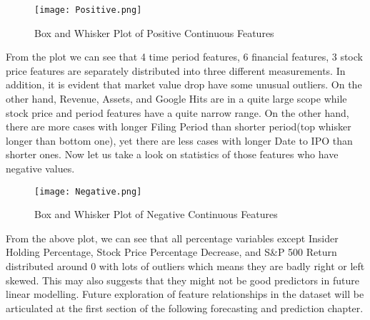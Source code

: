 \begin{figure}[H]
  \centering
  \texttt{[image: Positive.png]}
  \caption{Box and Whisker Plot of Positive Continuous Features}
\end{figure}
From the plot we can see that 4 time period features, 6 financial features, 3 stock price features are separately distributed into three different measurements. In addition, it is evident that market value drop have some unusual outliers. On the other hand, Revenue, Assets, and Google Hits are in a quite large scope while stock price and period features have a quite narrow range. On the other hand, there are more cases with longer Filing Period than shorter period(top whisker longer than bottom one), yet there are less cases with longer Date to IPO than shorter ones. Now let us take a look on statistics of those features who have negative values. 
\begin{figure}[H]
  \centering
  \texttt{[image: Negative.png]}
  \caption{Box and Whisker Plot of Negative Continuous Features}
\end{figure}
From the above plot, we can see that all percentage variables except Insider Holding Percentage, Stock Price Percentage Decrease, and S\&P 500 Return distributed around 0 with lots of outliers which means they are badly right or left skewed. This may also suggests that they might not be good predictors in future linear modelling. Future exploration of feature relationships in the dataset will be articulated at the first section of the following forecasting and prediction chapter. 